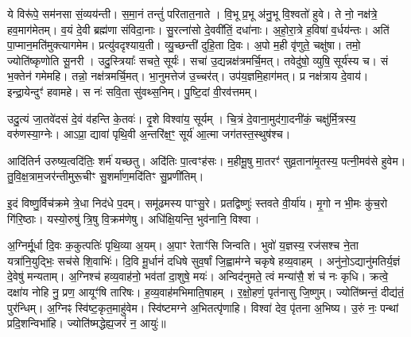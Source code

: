 ये विरू॑पे॒ सम॑नसा सं॒व्यय॑न्ती। स॒मा॒नं तन्तुं॑ परितात॒नाते।
वि॒भू प्र॒भू अ॑नु॒भू वि॒श्वतो॑ हुवे। ते नो॒ नक्ष॑त्रे॒ हव॒माग॑मेतम्।
व॒यं दे॒वी ब्रह्म॑णा संविदा॒नाः। सु॒रत्ना॑सो दे॒ववी॑तिं॒ दधा॑नाः।
अ॒हो॒रा॒त्रे ह॒विषा॑ व॒र्धय॑न्तः। अति॑ पा॒प्मान॒मति॑मुक्त्यागमेम।
प्रत्यु॑वदृश्याय॒ती। व्यु॒च्छन्ती॑ दुहि॒ता दि॒वः।
अ॒पो म॒ही वृ॑णुते॒ चक्षु॑षा। तमो॒ ज्योति॑ष्कृणोति सू॒नरी।
उदु॒स्त्रियाः᳚ सचते॒ सूर्यः॑। सचा॑ उ॒द्यन्नक्ष॑त्रमर्चि॒मत्।
तवेदु॑षो॒ व्युषि॒ सूर्य॑स्य च। सं भ॒क्तेन॑ गमेमहि।
तन्नो॒ नक्ष॑त्रमर्चि॒मत्। भा॒नुमत्तेज॑ उ॒च्चर॑त्।
उप॑य॒ज्ञमि॒हाग॑मत्।
प्र नक्ष॑त्राय दे॒वाय॑। इन्द्रा॒येन्दुꣳ॑ हवामहे।
स नः॑ सवि॒ता सु॑वथ्स॒निम्। पु॒ष्टि॒दां वी॒रव॑त्तमम्।


उदु॒त्यं जा॒तवे॑दसं दे॒वं व॑हन्ति के॒तवः॑। दृ॒शे विश्वा॑य॒ सूर्यम्।
चि॒त्रं दे॒वाना॒मुद॑गा॒दनी॑कं॒ चक्षु॑र्मि॒त्रस्य॒ वरु॑णस्या॒ग्नेः।
आऽप्रा॒ द्यावा॑ पृथि॒वी अ॒न्तरि॑क्ष॒ꣳ॒ सूर्य॑ आ॒त्मा जग॑तस्त॒स्थुष॑श्च।


आदि॑तिर्न उरुष्य॒त्वदि॑तिः॒ शर्म॑ यच्छतु। अदि॑तिः पा॒त्वꣳह॑सः।
म॒हीमू॒षु मा॒तरꣳ॑ सुव्र॒ताना॑मृ॒तस्य॒ पत्नी॒मव॑से हुवेम।
तु॒वि॒क्ष॒त्राम॒जर॑न्तीमुरू॒चीꣳ सु॒शर्मा॑ण॒\-मदि॑तिꣳ सु॒प्रणी॑तिम्।


इ॒दं विष्णु॒र्विच॑क्रमे त्रे॒धा निद॑धे प॒दम्। समू॑ढमस्य पाꣳसु॒रे।
प्रतद्विष्णुः॑ स्तवते वी॒र्या॑य। मृ॒गो न भी॒मः कु॑च॒रो गि॑रि॒ष्ठाः।
यस्यो॒रुषु॑ त्रि॒षु वि॒क्रम॑णेषु। अधि॑क्षि॒यन्ति॒ भुव॑नानि॒ विश्वा।

अ॒ग्निर्मू॒र्धा दि॒वः क॒कुत्पतिः॑ पृथि॒व्या अ॒यम्। अ॒पाꣳ रेताꣳ॑सि जिन्वति।
भुवो॑ य॒ज्ञस्य॒ रज॑सश्च ने॒ता यत्रा॑नि॒युद्भिः॒ सच॑से शि॒वाभिः॑।
दि॒वि मू॒र्धानं॑ दधिषे सुव॒र्\mbox{}षां जि॒ह्वाम॑ग्ने चकृषे हव्य॒वाहम्।
अनु॑नो॒ऽद्यानु॑मतिर्य॒ज्ञं दे॒वेषु॑ मन्यताम्।
अ॒ग्निश्च॑ हव्य॒वाह॑नो॒ भव॑तां दा॒शुषे॒ मयः॑।
अन्विद॑नुमते॒ त्वं मन्या॑सै॒ शं च॑ नः कृधि।
क्रत्वे॒ दक्षा॑य नोहि नु॒ प्रण॒ आयूꣳ॑षि तारिषः।
ह॒व्य॒वाह॑मभिमाति॒षाहम्। र॒क्षो॒हणं॒ पृत॑नासु जि॒ष्णुम्।
ज्योति॑ष्मन्तं॒ दीद्य॑तं॒ पुर॑न्धिम्। अ॒ग्निꣴ स्वि॑ष्ट॒कृत॒माहु॑वेम।
स्वि॑ष्टमग्ने अ॒भितत्पृ॑णाहि। विश्वा॑ देव॒ पृ॑तना अ॒भिष्य।
उ॒रुं नः॒ पन्थां प्रदि॒शन्विभा॑हि। ज्योति॑ष्मद्धेह्य॒जरं॑ न॒ आयुः॑॥


